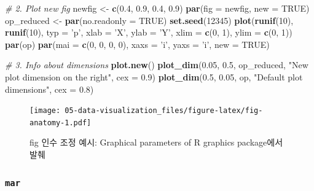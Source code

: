 \documentclass[
  11pt,
]{krantz}
\newenvironment{Shaded}{\begin{snugshade}}{\end{snugshade}}
\newcommand{\CommentTok}[1]{\textcolor[rgb]{0.37,0.37,0.37}{\textit{#1}}}
\newcommand{\DataTypeTok}[1]{\textcolor[rgb]{0.27,0.27,0.27}{#1}}
\newcommand{\DecValTok}[1]{\textcolor[rgb]{0.06,0.06,0.06}{#1}}
\newcommand{\FloatTok}[1]{\textcolor[rgb]{0.06,0.06,0.06}{#1}}
\newcommand{\KeywordTok}[1]{\textcolor[rgb]{0.27,0.27,0.27}{\textbf{#1}}}
\newcommand{\NormalTok}[1]{#1}
\newcommand{\OtherTok}[1]{\textcolor[rgb]{0.37,0.37,0.37}{#1}}
\newcommand{\StringTok}[1]{\textcolor[rgb]{0.5,0.5,0.5}{#1}}
\begin{document}
\begin{Shaded}
\begin{Highlighting}[]
\CommentTok{# 2. Plot new fig}
\NormalTok{newfig <-}\StringTok{ }\KeywordTok{c}\NormalTok{(}\FloatTok{0.4}\NormalTok{, }\FloatTok{0.9}\NormalTok{, }\FloatTok{0.4}\NormalTok{, }\FloatTok{0.9}\NormalTok{)}
\KeywordTok{par}\NormalTok{(}\DataTypeTok{fig =}\NormalTok{ newfig, }\DataTypeTok{new =} \OtherTok{TRUE}\NormalTok{)}
\NormalTok{op_reduced <-}\StringTok{ }\KeywordTok{par}\NormalTok{(}\DataTypeTok{no.readonly =} \OtherTok{TRUE}\NormalTok{)}
\KeywordTok{set.seed}\NormalTok{(}\DecValTok{12345}\NormalTok{)}
\KeywordTok{plot}\NormalTok{(}\KeywordTok{runif}\NormalTok{(}\DecValTok{10}\NormalTok{), }\KeywordTok{runif}\NormalTok{(}\DecValTok{10}\NormalTok{), }\DataTypeTok{typ =} \StringTok{'p'}\NormalTok{, }
    \DataTypeTok{xlab =} \StringTok{'X'}\NormalTok{, }\DataTypeTok{ylab =} \StringTok{'Y'}\NormalTok{, }\DataTypeTok{xlim =} \KeywordTok{c}\NormalTok{(}\DecValTok{0}\NormalTok{, }\DecValTok{1}\NormalTok{), }\DataTypeTok{ylim =} \KeywordTok{c}\NormalTok{(}\DecValTok{0}\NormalTok{, }\DecValTok{1}\NormalTok{))}
\KeywordTok{par}\NormalTok{(op)}
\KeywordTok{par}\NormalTok{(}\DataTypeTok{mai =} \KeywordTok{c}\NormalTok{(}\DecValTok{0}\NormalTok{, }\DecValTok{0}\NormalTok{, }\DecValTok{0}\NormalTok{, }\DecValTok{0}\NormalTok{), }\DataTypeTok{xaxs =} \StringTok{'i'}\NormalTok{, }\DataTypeTok{yaxs =} \StringTok{'i'}\NormalTok{, }\DataTypeTok{new =} \OtherTok{TRUE}\NormalTok{)}

\CommentTok{# 3. Info about dimensions}
\KeywordTok{plot.new}\NormalTok{()}
\KeywordTok{plot_dim}\NormalTok{(}\FloatTok{0.05}\NormalTok{, }\FloatTok{0.5}\NormalTok{, op_reduced, }\StringTok{"New plot dimension on the right"}\NormalTok{, }\DataTypeTok{cex =} \FloatTok{0.9}\NormalTok{)}
\KeywordTok{plot_dim}\NormalTok{(}\FloatTok{0.5}\NormalTok{, }\FloatTok{0.05}\NormalTok{, op, }\StringTok{"Default plot dimensions"}\NormalTok{, }\DataTypeTok{cex =} \FloatTok{0.8}\NormalTok{)}
\end{Highlighting}
\end{Shaded}

\begin{figure}
\centering
\texttt{[image: 05-data-visualization\_files/figure-latex/fig-anatomy-1.pdf]}
\caption{\label{fig:fig-anatomy}fig 인수 조정 예시: Graphical parameters of R graphics package에서 발췌}
\end{figure}

\normalsize

\hypertarget{mar}{%
\subsubsection*{\texorpdfstring{\textbf{\texttt{mar}}}{mar}}\label{mar}}
\end{document}
